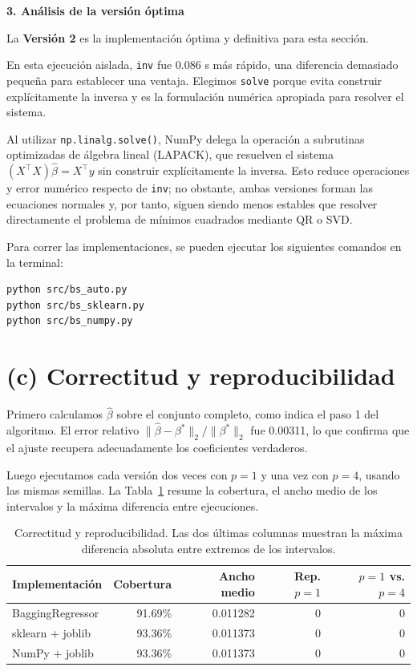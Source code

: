 \documentclass[12pt, letterpaper]{article}
\begin{document}
\textbf{3. Análisis de la versión óptima}

La \textbf{Versión 2} es la implementación óptima y definitiva para esta sección. 

En esta ejecución aislada, \texttt{inv} fue 0.086 s más rápido, una diferencia demasiado pequeña para establecer una ventaja. Elegimos \texttt{solve} porque evita construir explícitamente la inversa y es la formulación numérica apropiada para resolver el sistema.

Al utilizar \texttt{np.linalg.solve()}, NumPy delega la operación a subrutinas optimizadas de álgebra lineal (LAPACK), que resuelven el sistema $(X^{\top}X)\hat{\beta}=X^{\top}y$ sin construir explícitamente la inversa. Esto reduce operaciones y error numérico respecto de \texttt{inv}; no obstante, ambas versiones forman las ecuaciones normales y, por tanto, siguen siendo menos estables que resolver directamente el problema de mínimos cuadrados mediante QR o SVD.

Para correr las implementaciones, se pueden ejecutar los siguientes comandos en la terminal:
\begin{verbatim}
python src/bs_auto.py
python src/bs_sklearn.py
python src/bs_numpy.py
\end{verbatim}

\section*{(c) Correctitud y reproducibilidad}

Primero calculamos $\hat\beta$ sobre el conjunto completo, como indica el paso
1 del algoritmo. El error relativo
$\lVert\hat\beta-\beta^*\rVert_2/\lVert\beta^*\rVert_2$ fue 0.00311, lo que
confirma que el ajuste recupera adecuadamente los coeficientes verdaderos.

Luego ejecutamos cada versión dos veces con $p=1$ y una vez con $p=4$, usando
las mismas semillas. La Tabla~\ref{tab:correctitud-c} resume la cobertura, el
ancho medio de los intervalos y la máxima diferencia entre ejecuciones.

\begin{table}[h]
    \centering
    \small
    \begin{tabular}{|l|r|r|r|r|}
    \hline
    \textbf{Implementación} & \textbf{Cobertura} & \textbf{Ancho medio}
    & \textbf{Rep. $p=1$} & \textbf{$p=1$ vs. $p=4$} \\
    \hline
    BaggingRegressor & 91.69\% & 0.011282 & 0 & 0 \\
    sklearn + joblib & 93.36\% & 0.011373 & 0 & 0 \\
    NumPy + joblib & 93.36\% & 0.011373 & 0 & 0 \\
    \hline
    \end{tabular}
    \caption{Correctitud y reproducibilidad. Las dos últimas columnas muestran
    la máxima diferencia absoluta entre extremos de los intervalos.}
    \label{tab:correctitud-c}
\end{table}
\end{document}
